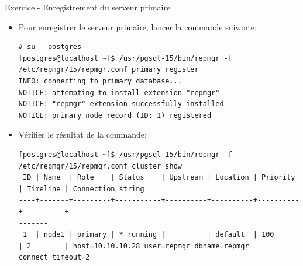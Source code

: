 \begin{frame}[fragile]{Exercice - Enregistrement du serveur primaire}

   \begin{itemize}
      \item Pour enregistrer le serveur primaire, lancer la commande suivante:
\begin{tiny}
\begin{Verbatim}[commandchars=\\\{\}]
# su - postgres
[postgres@localhost ~]$ /usr/pgsql-15/bin/repmgr -f /etc/repmgr/15/repmgr.conf primary register                                                                                              
INFO: connecting to primary database...
NOTICE: attempting to install extension "repmgr"
NOTICE: "repmgr" extension successfully installed
NOTICE: primary node record (ID: 1) registered
\end{Verbatim}
\end{tiny}
      \item Vérifier le résultat de la commande:
\begin{tiny}
\begin{Verbatim}[commandchars=\\\{\}]
[postgres@localhost ~]$ /usr/pgsql-15/bin/repmgr -f /etc/repmgr/15/repmgr.conf cluster show
 ID | Name  | Role    | Status    | Upstream | Location | Priority | Timeline | Connection string                                           
----+-------+---------+-----------+----------+----------+----------+----------+--------------------------------------------------------------
 1  | node1 | primary | * running |          | default  | 100      | 2        | host=10.10.10.28 user=repmgr dbname=repmgr connect_timeout=2
\end{Verbatim}
\end{tiny}
   \end{itemize}

\begin{toile}
\end{toile}

\end{frame}



